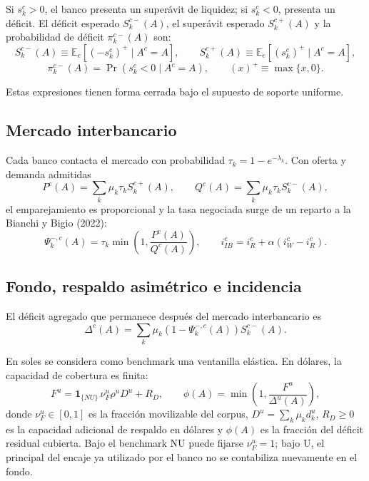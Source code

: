 \documentclass[11pt,a4paper]{article}
\begin{document}
Si $s^c_k>0$, el banco presenta un superávit de liquidez; si $s^c_k<0$, presenta un déficit. El déficit esperado $S^{c-}_k(A)$, el superávit esperado $S^{c+}_k(A)$ y la probabilidad de déficit $\pi^{c-}_k(A)$ son:
\begin{equation}
S_k^{c-}(A)
\equiv
\mathbb{E}_e\!\left[(-s_k^c)^+\mid A^c=A\right],
\qquad
S_k^{c+}(A)
\equiv
\mathbb{E}_e\!\left[(s_k^c)^+\mid A^c=A\right],
\end{equation}
\begin{equation}
\pi_k^{c-}(A)
=
\Pr(s_k^c<0\mid A^c=A),
\qquad
(x)^+\equiv\max\{x,0\}.
\end{equation}

Estas expresiones tienen forma cerrada bajo el supuesto de soporte uniforme.

\subsection{Mercado interbancario}

Cada banco contacta el mercado con probabilidad $\tau_k=1-e^{-\lambda_k}$. Con oferta y demanda admitidas
\begin{equation}
P^c(A)=\sum_k\mu_k\tau_k S^{c+}_k(A),
\qquad
Q^c(A)=\sum_k\mu_k\tau_k S^{c-}_k(A),
\end{equation}
el emparejamiento es proporcional y la tasa negociada surge de un reparto a la Bianchi y Bigio (2022):
\begin{equation}
\Psi^{-,c}_k(A)
=
\tau_k\min\!\left(1,\frac{P^c(A)}{Q^c(A)}\right),
\qquad
i^c_{IB}=i^c_R+\alpha\left(i^c_W-i^c_R\right).
\end{equation}

\subsection{Fondo, respaldo asimétrico e incidencia}

El déficit agregado que permanece después del mercado interbancario es
\begin{equation}
\Delta^c(A)
=
\sum_k\mu_k
\left(1-\Psi^{-,c}_k(A)\right)
S^{c-}_k(A).
\end{equation}

En soles se considera como benchmark una ventanilla elástica. En dólares, la capacidad de cobertura es finita:
\begin{equation}
F^u
=
\mathbf{1}_{\{NU\}}\,
\nu_F^u\rho^uD^u
+
R_D,
\qquad
\phi(A)
=
\min\!\left(1,\frac{F^u}{\Delta^u(A)}\right),
\end{equation}
donde $\nu_F^u\in[0,1]$ es la fracción movilizable del corpus, $D^u=\sum_k\mu_kd_k^u$, $R_D\geq0$ es la capacidad adicional de respaldo en dólares y $\phi(A)$ es la fracción del déficit residual cubierta. Bajo el benchmark NU puede fijarse $\nu_F^u=1$; bajo U, el principal del encaje ya utilizado por el banco no se contabiliza nuevamente en el fondo.
\end{document}
